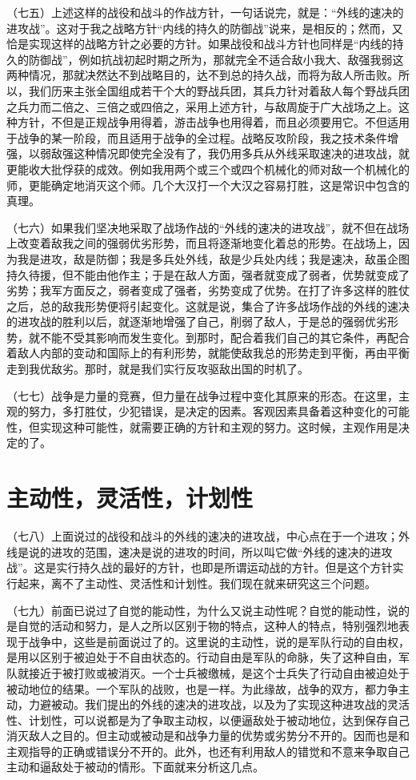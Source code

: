 （七五）上述这样的战役和战斗的作战方针，一句话说完，就是：“外线的速决的进攻战”。这对于我之战略方针“内线的持久的防御战”说来，是相反的；然而，又恰是实现这样的战略方针之必要的方针。如果战役和战斗方针也同样是“内线的持久的防御战”，例如抗战初起时期之所为，那就完全不适合敌小我大、敌强我弱这两种情况，那就决然达不到战略目的，达不到总的持久战，而将为敌人所击败。所以，我们历来主张全国组成若干个大的野战兵团，其兵力针对着敌人每个野战兵团之兵力而二倍之、三倍之或四倍之，采用上述方针，与敌周旋于广大战场之上。这种方针，不但是正规战争用得着，游击战争也用得着，而且必须要用它。不但适用于战争的某一阶段，而且适用于战争的全过程。战略反攻阶段，我之技术条件增强，以弱敌强这种情况即使完全没有了，我仍用多兵从外线采取速决的进攻战，就更能收大批俘获的成效。例如我用两个或三个或四个机械化的师对敌一个机械化的师，更能确定地消灭这个师。几个大汉打一个大汉之容易打胜，这是常识中包含的真理。

（七六）如果我们坚决地采取了战场作战的“外线的速决的进攻战”，就不但在战场上改变着敌我之间的强弱优劣形势，而且将逐渐地变化着总的形势。在战场上，因为我是进攻，敌是防御；我是多兵处外线，敌是少兵处内线；我是速决，敌虽企图持久待援，但不能由他作主；于是在敌人方面，强者就变成了弱者，优势就变成了劣势；我军方面反之，弱者变成了强者，劣势变成了优势。在打了许多这样的胜仗之后，总的敌我形势便将引起变化。这就是说，集合了许多战场作战的外线的速决的进攻战的胜利以后，就逐渐地增强了自己，削弱了敌人，于是总的强弱优劣形势，就不能不受其影响而发生变化。到那时，配合着我们自己的其它条件，再配合着敌人内部的变动和国际上的有利形势，就能使敌我总的形势走到平衡，再由平衡走到我优敌劣。那时，就是我们实行反攻驱敌出国的时机了。

（七七）战争是力量的竞赛，但力量在战争过程中变化其原来的形态。在这里，主观的努力，多打胜仗，少犯错误，是决定的因素。客观因素具备着这种变化的可能性，但实现这种可能性，就需要正确的方针和主观的努力。这时候，主观作用是决定的了。

\section{主动性，灵活性，计划性}

（七八）上面说过的战役和战斗的外线的速决的进攻战，中心点在于一个进攻；外线是说的进攻的范围，速决是说的进攻的时间，所以叫它做“外线的速决的进攻战”。这是实行持久战的最好的方针，也即是所谓运动战的方针。但是这个方针实行起来，离不了主动性、灵活性和计划性。我们现在就来研究这三个问题。

（七九）前面已说过了自觉的能动性，为什么又说主动性呢？自觉的能动性，说的是自觉的活动和努力，是人之所以区别于物的特点，这种人的特点，特别强烈地表现于战争中，这些是前面说过了的。这里说的主动性，说的是军队行动的自由权，是用以区别于被迫处于不自由状态的。行动自由是军队的命脉，失了这种自由，军队就接近于被打败或被消灭。一个士兵被缴械，是这个士兵失了行动自由被迫处于被动地位的结果。一个军队的战败，也是一样。为此缘故，战争的双方，都力争主动，力避被动。我们提出的外线的速决的进攻战，以及为了实现这种进攻战的灵活性、计划性，可以说都是为了争取主动权，以便逼敌处于被动地位，达到保存自己消灭敌人之目的。但主动或被动是和战争力量的优势或劣势分不开的。因而也是和主观指导的正确或错误分不开的。此外，也还有利用敌人的错觉和不意来争取自己主动和逼敌处于被动的情形。下面就来分析这几点。

